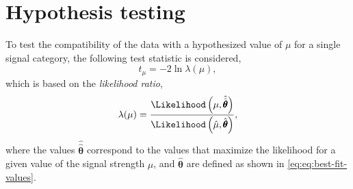 \section{Hypothesis testing}
\label{sec:hypothesis-testing}
To test the compatibility of the data with a hypothesized value of $\mu$ for a single signal category, the following test statistic is considered,
\begin{equation}
    t_\mu = -2 \ln \lambda(\mu),
\end{equation}
which is based on the \emph{likelihood ratio},
\begin{equation}
    \label{eq:likelihoodratio}
    \lambda(\mu) = \frac{ \Likelihood \left( \mu, \hat{\hat{\pmb{\theta}}} \right) } { \Likelihood \left( \hat{\mu} , \hat{\pmb{\theta}} \right) },
\end{equation}
where the values $\hat{\hat{\pmb{\theta}}}$ correspond to the values that maximize the likelihood for a given value of the signal strength $\mu$, and $\hat{\pmb{\theta}}$ are defined as shown in \cref{eq:eq:best-fit-values}. 

